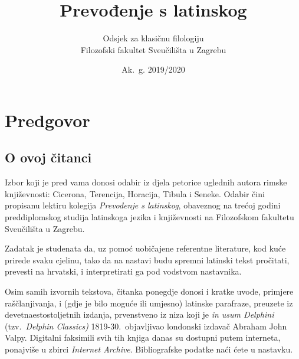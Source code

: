 \documentclass[a4paper,12pt,twoside]{book}
\newcommand{\subtitle}[1]{%
  \posttitle{%
    \par\end{center}
    \begin{center}\large#1\end{center}
    \vskip0.5em}%
}
\begin{document}
\title{Prevođenje s latinskog}
\subtitle{Čitanka}
\author{Odsjek za klasičnu filologiju\\
Filozofski fakultet Sveučilišta u Zagrebu}
\date{Ak.~g. 2019/2020}
\maketitle

\clearpage
\thispagestyle{empty}




\chapter*{Predgovor}

\section*{O ovoj čitanci}

Izbor koji je pred vama donosi odabir iz djela petorice uglednih autora rimske književnosti: Cicerona, Terencija, Horacija, Tibula i Seneke. Odabir čini propisanu lektiru kolegija \textit{Prevođenje s latinskog}, obaveznog na trećoj godini preddiplomskog studija latinskoga jezika i književnosti na Filozofskom fakultetu Sveučilišta u Zagrebu.

Zadatak je studenata da, uz pomoć uobičajene referentne literature, kod kuće prirede svaku cjelinu, tako da na nastavi budu spremni latinski tekst pročitati, prevesti na hrvatski, i interpretirati ga pod vodstvom nastavnika.


Osim samih izvornih tekstova, čitanka ponegdje donosi i kratke uvode, primjere raščlanjivanja, i (gdje je bilo moguće ili umjesno) latinske parafraze, preuzete iz devetnaestostoljetnih izdanja, prvenstveno iz niza koji je \textit{in usum Delphini} (tzv.\ \textit{Delphin Classics)} 1819-30.\ objavljivao londonski izdavač Abraham John Valpy. Digitalni faksimili svih tih knjiga danas su dostupni putem interneta, ponajviše u zbirci \textit{Internet Archive}. Bibliografske podatke naći ćete u nastavku. 
\end{document}
